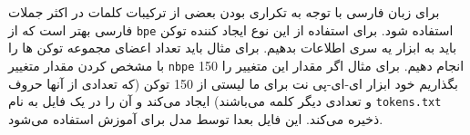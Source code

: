 
برای زبان فارسی با توجه به تکراری بودن بعضی از ترکیبات کلمات در اکثر جملات فارسی بهتر است که از 
\verb|bpe|
استفاده شود.
برای استفاده از این نوع ایجاد کننده توکن باید به ابزار یه سری اطلاعات بدهیم. برای مثال باید تعداد اعضای مجموعه توکن ها را با مشخص کردن مقدار متغییر 
\verb|nbpe|
انجام دهیم. برای مثال اگر مقدار این متغییر را 150 بگذاریم خود ابزار ای-ای-پی نت برای ما لیستی از 150 توکن (که تعدادی از آنها حروف و تعدادی دیگر کلمه می‌باشند) ایجاد می‌کند و آن را در یک فایل به نام \verb|tokens.txt|
ذخیره می‌کند. این فایل بعدا توسط مدل برای آموزش استفاده می‌شود.

